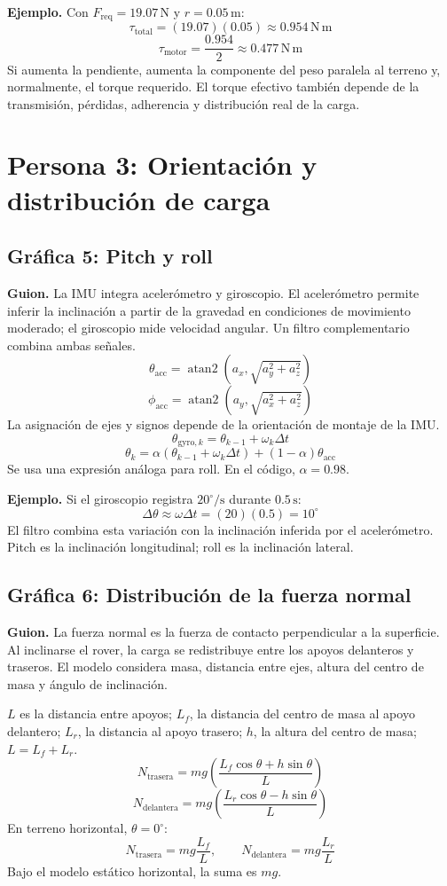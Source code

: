 \documentclass[12pt,a4paper]{article}
\begin{document}
\textbf{Ejemplo.} Con \(F_{\mathrm{req}}=19.07\,\mathrm{N}\) y \(r=0.05\,\mathrm{m}\):
\[
\tau_{\mathrm{total}}=(19.07)(0.05)\approx0.954\,\mathrm{N\,m}
\]
\[
\tau_{\mathrm{motor}}=\frac{0.954}{2}\approx0.477\,\mathrm{N\,m}
\]
Si aumenta la pendiente, aumenta la componente del peso paralela al terreno y, normalmente, el torque requerido. El torque efectivo también depende de la transmisión, pérdidas, adherencia y distribución real de la carga.

\section{Persona 3: Orientación y distribución de carga}
\subsection{Gráfica 5: Pitch y roll}
\textbf{Guion.} La IMU integra acelerómetro y giroscopio. El acelerómetro permite inferir la inclinación a partir de la gravedad en condiciones de movimiento moderado; el giroscopio mide velocidad angular. Un filtro complementario combina ambas señales.
\[
\boxed{\theta_{\mathrm{acc}}=
\operatorname{atan2}\left(a_x,\sqrt{a_y^2+a_z^2}\right)}
\]
\[
\boxed{\phi_{\mathrm{acc}}=
\operatorname{atan2}\left(a_y,\sqrt{a_x^2+a_z^2}\right)}
\]
La asignación de ejes y signos depende de la orientación de montaje de la IMU.
\[
\theta_{\mathrm{gyro},k}=\theta_{k-1}+\omega_k\Delta t
\]
\[
\boxed{\theta_k=
\alpha\left(\theta_{k-1}+\omega_k\Delta t\right)
+(1-\alpha)\theta_{\mathrm{acc}}}
\]
Se usa una expresión análoga para roll. En el código, \(\alpha=0.98\).

\textbf{Ejemplo.} Si el giroscopio registra \(20^\circ/\mathrm{s}\) durante \(0.5\,\mathrm{s}\):
\[
\Delta\theta\approx\omega\Delta t=(20)(0.5)=10^\circ
\]
El filtro combina esta variación con la inclinación inferida por el acelerómetro. Pitch es la inclinación longitudinal; roll es la inclinación lateral.

\subsection{Gráfica 6: Distribución de la fuerza normal}
\textbf{Guion.} La fuerza normal es la fuerza de contacto perpendicular a la superficie. Al inclinarse el rover, la carga se redistribuye entre los apoyos delanteros y traseros. El modelo considera masa, distancia entre ejes, altura del centro de masa y ángulo de inclinación.

\(L\) es la distancia entre apoyos; \(L_f\), la distancia del centro de masa al apoyo delantero; \(L_r\), la distancia al apoyo trasero; \(h\), la altura del centro de masa; \(L=L_f+L_r\).
\[
\boxed{N_{\mathrm{trasera}}=
mg\left(\frac{L_f\cos\theta+h\sin\theta}{L}\right)}
\]
\[
\boxed{N_{\mathrm{delantera}}=
mg\left(\frac{L_r\cos\theta-h\sin\theta}{L}\right)}
\]
En terreno horizontal, \(\theta=0^\circ\):
\[
N_{\mathrm{trasera}}=mg\frac{L_f}{L},
\qquad
N_{\mathrm{delantera}}=mg\frac{L_r}{L}
\]
Bajo el modelo estático horizontal, la suma es \(mg\).
\end{document}
